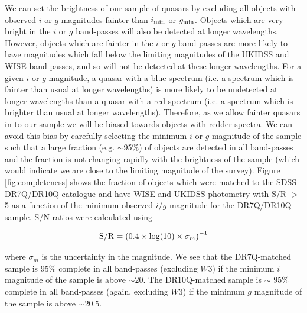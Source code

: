 We can set the brightness of our sample of quasars by excluding all objects with observed $i$ or $g$ magnitudes fainter than $i_{\rm min}$ or $g_{\rm min}$. Objects which are very bright in the $i$ or $g$ band-passes will also be detected at longer wavelengths. However, objects which are fainter in the $i$ or $g$ band-passes are more likely to have magnitudes which fall below the limiting magnitudes of the UKIDSS and WISE band-passes, and so will not be detected at these longer wavelengths. For a given $i$ or $g$ magnitude, a quasar with a blue spectrum (i.e. a spectrum which is fainter than usual at longer wavelengths) is more likely to be undetected at longer wavelengths than a quasar with a red spectrum (i.e. a spectrum which is brighter than usual at longer wavelengths). Therefore, as we allow fainter quasars in to our sample we will be biased towards objects with redder spectra. We can avoid this bias by carefully selecting the minimum $i$ or $g$ magnitude of the sample such that a large fraction (e.g. $\sim$95\%) of objects are detected in all band-passes and the fraction is not changing rapidly with the brightness of the sample (which would indicate we are close to the limiting magnitude of the survey). Figure \ref{fig:completeness} shows the fraction of objects which were matched to the SDSS DR7Q/DR10Q catalogue and have WISE and UKIDSS photometry with S/R $>$ 5 as a function of the minimum observed $i$/$g$ magnitude for the DR7Q/DR10Q sample. S/N ratios were calculated using

\begin{eqnarray}
  {\rm S/R} = \left( 0.4 \times {\rm log}(10) \times \sigma_m \right)^{-1}
\end{eqnarray}

where $\sigma_m$ is the uncertainty in the magnitude. We see that the DR7Q-matched sample is 95\% complete in all band-passes (excluding $W3$) if the minimum $i$ magnitude of the sample is above $\sim 20$. The DR10Q-matched sample is $\sim$ 95\% complete in all band-passes (again, excluding $W3$) if the minimum $g$ magnitude of the sample is above $\sim 20.5$. 

